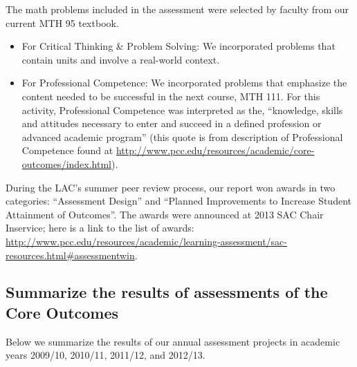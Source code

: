 \begin{description}
The math problems included in the assessment were selected by faculty from our current MTH 95 textbook.
\begin{itemize}
\item For Critical Thinking \& Problem Solving: We incorporated problems that contain units and involve a real-world context.
\item For Professional Competence:  We incorporated problems that emphasize the content needed to be successful in the next course, MTH 111.  For this activity, Professional Competence was interpreted as the, ``knowledge, skills and attitudes necessary to enter and succeed in a defined profession or advanced academic program'' (this quote is from description of Professional Competence found at \url{http://www.pcc.edu/resources/academic/core-outcomes/index.html}).
\end{itemize}
During the LAC's summer peer review process, our report won awards in two categories: ``Assessment Design'' and ``Planned Improvements to Increase Student Attainment of Outcomes''.  The awards were announced at 2013 SAC Chair Inservice; here is a link to the list of awards: \url{http://www.pcc.edu/resources/academic/learning-assessment/sac-resources.html#assessmentwin}.

\end{description}

\subsection{Summarize the results of assessments of the Core Outcomes}

Below we summarize the results of our annual assessment projects in academic years 2009/10, 2010/11, 2011/12, and 2012/13.

